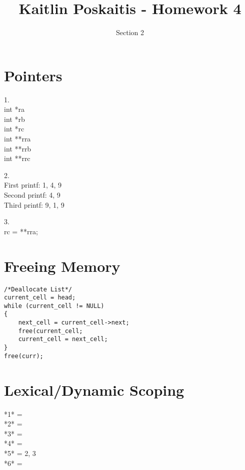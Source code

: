 \documentclass[11pt]{article}
\title{\bf Kaitlin Poskaitis - Homework 4}
\author{Section 2}
\date{}
\begin{document}
\maketitle

\section{Pointers}

1.\\  
\indent\indent int *ra \\
\indent\indent int *rb \\
\indent\indent int *rc \\
\indent\indent int **rra \\
\indent\indent int **rrb\\
\indent\indent int **rrc

2.\\ 
\indent\indent First printf: 1, 4, 9\\
\indent\indent Second printf: 4, 9\\
\indent\indent Third printf: 9, 1, 9


3.\\
\indent\indent rc = **rra;

\section{Freeing Memory}

\begin{lstlisting}
/*Deallocate List*/
current_cell = head;
while (current_cell != NULL)
{
	next_cell = current_cell->next;
	free(current_cell;
	current_cell = next_cell;
}
free(curr);

\end{lstlisting}

\section{Lexical/Dynamic Scoping}

*1* = \\
*2* = \\
*3* = \\
*4* = \\
*5* = 2, 3 \\
*6* = \\
\end{document}
